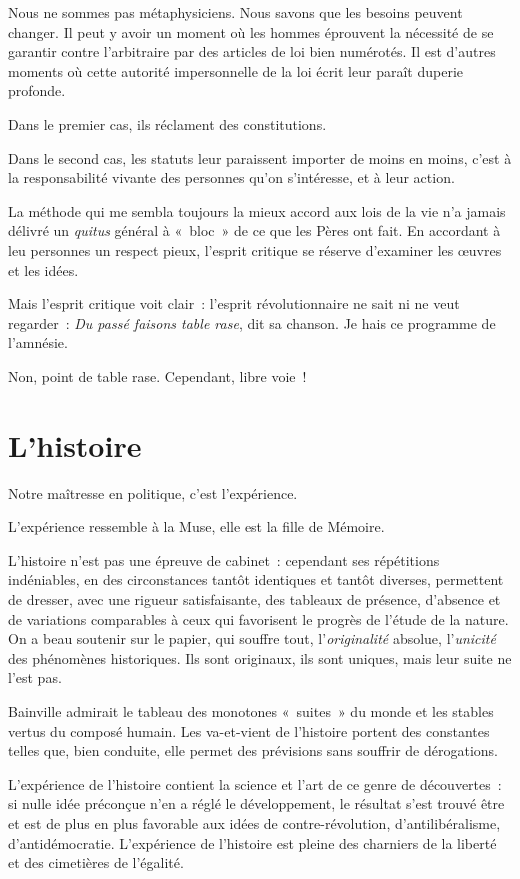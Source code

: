 \documentclass[french,twoside]{book} %
\newcommand{\astermono}{\medskip\centerline{\color{rubric}\large\selectfont{\syms ✻}}\medskip\par}%
\begin{document}
\astermono

\noindent Nous ne sommes pas métaphysiciens. Nous savons que les besoins peuvent changer. Il peut y avoir un moment où les hommes éprouvent la nécessité de se garantir contre l’arbitraire par des articles de loi bien numérotés. Il est d’autres moments où cette autorité impersonnelle de la loi écrit leur paraît duperie profonde.\par
Dans le premier cas, ils réclament des constitutions.\par
Dans le second cas, les statuts leur paraissent importer de moins en moins, c’est à la responsabilité vivante des personnes qu’on s’intéresse, et à leur action.\par

\astermono

\noindent La méthode qui me sembla toujours la mieux accord aux lois de la vie n’a jamais délivré un \emph{quitus} général à « bloc » de ce que les Pères ont fait. En accordant à leu personnes un respect pieux, l’esprit critique se réserve d’examiner les œuvres et les idées.\par
Mais l’esprit critique voit clair : l’esprit révolutionnaire ne sait ni ne veut regarder : \emph{Du passé faisons table rase}, dit sa chanson. Je hais ce programme de l’amnésie.\par
Non, point de table rase. Cependant, libre voie !
\section[{L’histoire}]{L’histoire}
\noindent Notre maîtresse en politique, c’est l’expérience.\par

\astermono

\noindent L’expérience ressemble à la Muse, elle est la fille de Mémoire.\par

\astermono

\noindent L’histoire n’est pas une épreuve de cabinet : cependant ses répétitions indéniables, en des circonstances tantôt identiques et tantôt diverses, permettent de dresser, avec une rigueur satisfaisante, des tableaux de présence, d’absence et de variations comparables à ceux qui favorisent le progrès de l’étude de la nature. On a beau soutenir sur le papier, qui souffre tout, l’\emph{originalité} absolue, l’\emph{unicité} des phénomènes historiques. Ils sont originaux, ils sont uniques, mais leur suite ne l’est pas.\par
Bainville admirait le tableau des monotones « suites » du monde et les stables vertus du composé humain. Les va-et-vient de l’histoire portent des constantes telles que, bien conduite, elle permet des prévisions sans souffrir de dérogations.\par
L’expérience de l’histoire contient la science et l’art de ce genre de découvertes : si nulle idée préconçue n’en a réglé le développement, le résultat s’est trouvé être et est de plus en plus favorable aux idées de contre-révolution, d’antilibéralisme, d’antidémocratie. L’expérience de l’histoire est pleine des charniers de la liberté et des cimetières de l’égalité.\par
\end{document}
